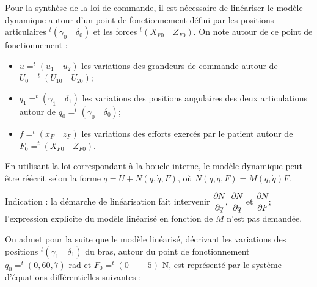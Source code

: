 Pour la synthèse de la loi de commande, il est nécessaire de linéariser le modèle dynamique autour d’un point
de fonctionnement défini par les positions articulaires $ ^t(\gamma_0 \quad \delta_0)$ et les forces $ ^t\left(X_{F0}\quad Z_{F0}\right)$. On note autour de ce point de fonctionnement :
\begin{itemize}
\item $ u = ^t\left(u_1\quad u_2\right)$ les variations des grandeurs de commande autour de $ U_0 = ^t\left(U_{10}\quad U_{20}\right)$;
\item $q_1 = ^t\left(\gamma_1 \quad \delta_1\right)$ les variations des positions angulaires des deux articulations autour de $q_0 = ^t\left(\gamma_0 \quad \delta_0\right)$;
\item $ f = ^t\left(x_F \quad z_F \right)$ les variations des efforts exercés par le patient autour de $F_0 =  ^t\left(X_{F0} \quad Z_{F0} \right)$.
\end{itemize}
En utilisant la loi correspondant à la boucle interne, le modèle dynamique peut-être réécrit selon la forme
$\ddot{q}= U + N\left(q, \dot{q}, F\right)$, où $N\left(q, \dot{q}, F\right) = M\left(q, \dot{q}\right) F$.



\ifprof
\begin{corrige}
\end{corrige}
\else
\fi



\ifprof
\begin{corrige}
\end{corrige}
\else
\fi


Indication : la démarche de linéarisation fait intervenir $\dfrac{\partial N}{\partial q}$, $\dfrac{\partial N}{\partial \dot{q}}$ et $\dfrac{\partial N}{\partial F}$; l’expression explicite du modèle linéarisé
en fonction de $M$ n’est pas demandée.


On admet pour la suite que le modèle linéarisé, décrivant les variations des positions $ ^t\left(\gamma_1 \quad \delta_1 \right)$ du bras, autour du point de fonctionnement $q_0 = ^t\left(0,6 0,7\right)$ rad et $F_0 = ^t\left(0 \quad -5\right)$ N, est représenté par le système d’équations différentielles suivantes :


